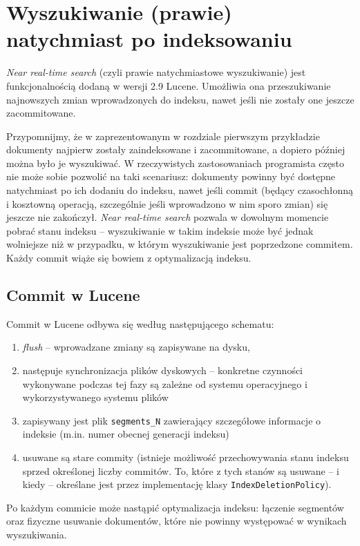\chapter{Wyszukiwanie (prawie) natychmiast po indeksowaniu}

\emph{Near real-time search} (czyli prawie natychmiastowe wyszukiwanie) jest funkcjonalnością dodaną w wersji 2.9 Lucene. Umożliwia ona przeszukiwanie najnowszych zmian wprowadzonych do indeksu, nawet jeśli nie zostały one jeszcze zacommitowane. 

Przypomnijmy, że w zaprezentowanym w rozdziale pierwszym przykładzie dokumenty najpierw zostały zaindeksowane i zacommitowane, a dopiero później można było je wyszukiwać. W rzeczywistych zastosowaniach programista często nie może sobie pozwolić na taki scenariusz: dokumenty powinny być dostępne natychmiast po ich dodaniu do indeksu, nawet jeśli commit (będący czasochłonną i kosztowną operacją, szczególnie jeśli wprowadzono w nim sporo zmian) się jeszcze nie zakończył. \emph{Near real-time search} pozwala w dowolnym momencie pobrać stanu indeksu -- wyszukiwanie w takim indeksie może być jednak wolniejsze niż w przypadku, w którym wyszukiwanie jest poprzedzone commitem. Każdy commit wiąże się bowiem z optymalizacją indeksu.

\section{Commit w Lucene}

Commit w Lucene odbywa się według następującego schematu:
\begin{enumerate}
 \item \emph{flush} -- wprowadzane zmiany są zapisywane na dysku,
 \item następuje synchronizacja plików dyskowych -- konkretne czynności wykonywane podczas tej fazy są zależne od systemu operacyjnego i wykorzystywanego systemu plików
 \item zapisywany jest plik \texttt{segments\_N} zawierający szczegółowe informacje o indeksie (m.in. numer obecnej generacji indeksu)
 \item usuwane są stare commity (istnieje możliwość przechowywania stanu indeksu sprzed określonej liczby commitów. To, które z tych stanów są usuwane -- i kiedy -- określane jest przez implementację klasy \texttt{IndexDeletionPolicy}).
\end{enumerate}

Po każdym commicie może nastąpić optymalizacja indeksu: łączenie segmentów oraz fizyczne usuwanie dokumentów, które nie powinny występować w wynikach wyszukiwania.

